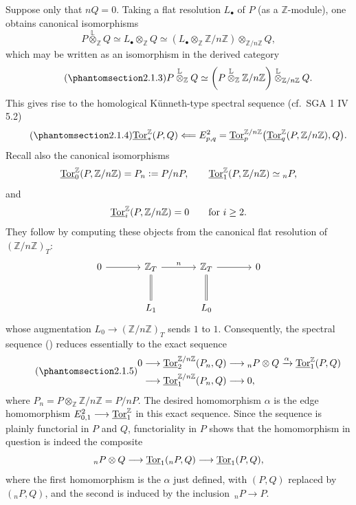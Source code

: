 Suppose only that $nQ=0$.  Taking a flat resolution $L_\bullet$ of
$P$ (as a $\mathbb Z$-module), one obtains canonical isomorphisms
\[
 P\mathbin{\overset{\mathbb L}{\otimes}_{\mathbb Z}}Q
 \simeq L_\bullet\otimes_{\mathbb Z}Q
 \simeq
 (L_\bullet\otimes_{\mathbb Z}\mathbb Z/n\mathbb Z)
 \otimes_{\mathbb Z/n\mathbb Z}Q,
\]
which may be written as an isomorphism in the derived category
\begin{equation}\tag{\SGARefTarget{sga7.sga7i.eviii.n2-1-3}{2.1.3}}
 P\mathbin{\overset{\mathbb L}{\otimes}_{\mathbb Z}}Q
 \simeq
 \left(P\mathbin{\overset{\mathbb L}{\otimes}_{\mathbb Z}}
       \mathbb Z/n\mathbb Z\right)
 \mathbin{\overset{\mathbb L}{\otimes}_{\mathbb Z/n\mathbb Z}}Q.
\end{equation}
This gives rise to the homological K\"unneth-type spectral sequence
(cf.\ SGA 1 IV 5.2)
\begin{equation}\tag{\SGARefTarget{sga7.sga7i.eviii.n2-1-4}{2.1.4}}
 \uTor^{\mathbb Z}_*(P,Q)
 \Longleftarrow
 E^2_{p,q}
 =
 \uTor^{\mathbb Z/n\mathbb Z}_p
 \bigl(\uTor^{\mathbb Z}_q(P,\mathbb Z/n\mathbb Z),Q\bigr).
\end{equation}
Recall also the canonical isomorphisms
\[
 \uTor^{\mathbb Z}_0(P,\mathbb Z/n\mathbb Z)
 =P_n\mathrel{\mathop:}=P/nP,
 \qquad
 \uTor^{\mathbb Z}_1(P,\mathbb Z/n\mathbb Z)\simeq{}_nP,
\]
and
\[
 \uTor^{\mathbb Z}_i(P,\mathbb Z/n\mathbb Z)=0
 \qquad\text{for }i\geq2.
\]
They follow by computing these objects from the canonical flat
resolution of $(\mathbb Z/n\mathbb Z)_T$:
\[
\begin{tikzcd}[column sep=large,row sep=large]
 0\arrow[r]&
 \mathbb Z_T\arrow[r,"n"]\arrow[d,equal]&
 \mathbb Z_T\arrow[r]\arrow[d,equal]&
 0\\
 &L_1&L_0&
\end{tikzcd}
\]
whose augmentation
$L_0\longrightarrow(\mathbb Z/n\mathbb Z)_T$ sends $1$ to $1$.
Consequently, the spectral sequence () reduces essentially to
the exact sequence
\begin{equation}\tag{\SGARefTarget{sga7.sga7i.eviii.n2-1-5}{2.1.5}}
\begin{split}
0\longrightarrow{}&
 \uTor^{\mathbb Z/n\mathbb Z}_2(P_n,Q)
 \longrightarrow{}_nP\otimes Q
 \xrightarrow{\alpha}\uTor^{\mathbb Z}_1(P,Q)\\
\longrightarrow{}&
 \uTor^{\mathbb Z/n\mathbb Z}_1(P_n,Q)
 \longrightarrow0,
\end{split}
\end{equation}
where $P_n=P\otimes_{\mathbb Z}\mathbb Z/n\mathbb Z=P/nP$.
The desired homomorphism $\alpha$ is the edge homomorphism
$E^2_{0,1}\longrightarrow\uTor^{\mathbb Z}_1$ in this exact sequence.
Since the sequence is plainly functorial in $P$ and $Q$, functoriality
in $P$ shows that the homomorphism in question is indeed the composite
\[
 {}_nP\otimes Q
 \longrightarrow\uTor_1({}_nP,Q)
 \longrightarrow\uTor_1(P,Q),
\]
where the first homomorphism is the $\alpha$ just defined, with
$(P,Q)$ replaced by $({}_nP,Q)$, and the second is induced by the
inclusion $\,{}_nP\longrightarrow P$.

